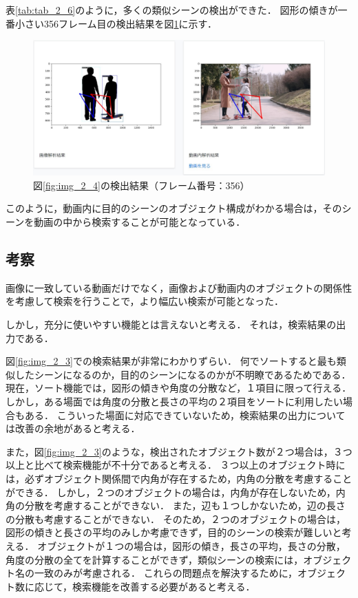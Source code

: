 \documentclass[a4j,12pt,dvipdfmx]{jreport}
\begin{document}
表\ref{tab:tab_2_6}のように，多くの類似シーンの検出ができた．
図形の傾きが一番小さい356フレーム目の検出結果を図\ref{fig:img_2_4_3}に示す．
\begin{figure}[H]
  \centering
  \includegraphics[width=13cm]{image/result_2_4_3.jpg}
  \caption{図\ref{fig:img_2_4}の検出結果（フレーム番号：356）}
  \label{fig:img_2_4_3}
\end{figure}

このように，動画内に目的のシーンのオブジェクト構成がわかる場合は，そのシーンを動画の中から検索することが可能となっている．

\subsection{考察}\label{chap4-3-1}
画像に一致している動画だけでなく，画像および動画内のオブジェクトの関係性を考慮して検索を行うことで，より幅広い検索が可能となった．

しかし，充分に使いやすい機能とは言えないと考える．
それは，検索結果の出力である．

図\ref{fig:img_2_3}での検索結果が非常にわかりずらい．
何でソートすると最も類似したシーンになるのか，目的のシーンになるのかが不明瞭であるためである．
現在，ソート機能では，図形の傾きや角度の分散など，１項目に限って行える．
しかし，ある場面では角度の分散と長さの平均の２項目をソートに利用したい場合もある．
こういった場面に対応できていないため，検索結果の出力については改善の余地があると考える．

また，図\ref{fig:img_2_3}のような，検出されたオブジェクト数が２つ場合は，３つ以上と比べて検索機能が不十分であると考える．
３つ以上のオブジェクト時には，必ずオブジェクト関係間で内角が存在するため，内角の分散を考慮することができる．
しかし，２つのオブジェクトの場合は，内角が存在しないため，内角の分散を考慮することができない．
また，辺も１つしかないため，辺の長さの分散も考慮することができない．
そのため，２つのオブジェクトの場合は，図形の傾きと長さの平均のみしか考慮できず，目的のシーンの検索が難しいと考える．
オブジェクトが１つの場合は，図形の傾き，長さの平均，長さの分散，角度の分散の全てを計算することができず，類似シーンの検索には，オブジェクト名の一致のみが考慮される．
これらの問題点を解決するために，オブジェクト数に応じて，検索機能を改善する必要があると考える．
\end{document}
